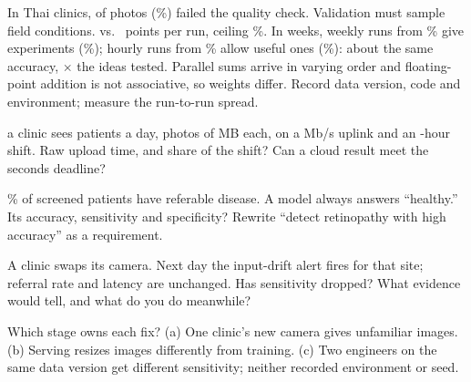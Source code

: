\documentclass{studysheet}
\begin{document}
\begin{rightcol}
%
  {In Thai clinics,  of  photos (\%) failed the quality check.
   Validation must sample field conditions.}{}
%
  { vs.\  points per run, ceiling \%. In  weeks, weekly
   runs from \% give  experiments (\%); hourly runs from
   \% allow  useful ones (\%): about the same accuracy, $\times$ the ideas tested.}{}
%
  {Parallel sums arrive in varying order and floating-point addition is not associative, so
   weights differ. Record data version, code and environment; measure the run-to-run spread.}{}

\begin{qs}
\item \assumed{} a clinic sees  patients a day,  photos of  MB each, on a
   Mb/s uplink and an -hour shift. Raw upload time, and share of the shift? Can a cloud result meet the seconds deadline?
\item \assumed{} \% of screened patients have referable disease. A model always answers
  ``healthy.'' Its accuracy, sensitivity and specificity? Rewrite
  ``detect retinopathy with high accuracy'' as a requirement.
\item A clinic swaps its camera. Next day the input-drift alert fires for that site; referral rate and
  latency are unchanged. Has sensitivity dropped? What evidence would tell, and what do you do meanwhile?
\item Which stage owns each fix? (a) One clinic's new camera gives unfamiliar images. (b) Serving resizes images differently
  from training. (c) Two engineers on the same data version get different sensitivity; neither recorded environment or seed.
\end{qs}
\end{rightcol}
\end{document}
